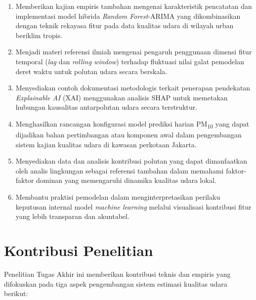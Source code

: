 \begin{enumerate}
   \item Memberikan kajian empiris tambahan mengenai karakteristik pencatatan dan implementasi model hibrida \textit{Random Forest}-ARIMA yang dikombinasikan dengan teknik rekayasa fitur pada data kualitas udara di wilayah urban beriklim tropis.
   \item Menjadi materi referensi ilmiah mengenai pengaruh penggunaan dimensi fitur temporal (\textit{lag} dan \textit{rolling window}) terhadap fluktuasi nilai galat pemodelan deret waktu untuk polutan udara secara berskala.
   \item Menyediakan contoh dokumentasi metodologis terkait penerapan pendekatan \textit{Explainable AI} (XAI) menggunakan analisis SHAP untuk memetakan hubungan kausalitas antarpolutan udara secara terstruktur.
   \item Menghasilkan rancangan konfigurasi model prediksi harian PM\textsubscript{10} yang dapat dijadikan bahan pertimbangan atau komponen awal dalam pengembangan sistem kajian kualitas udara di kawasan perkotaan Jakarta.
   \item Menyediakan data dan analisis kontribusi polutan yang dapat dimanfaatkan oleh analis lingkungan sebagai referensi tambahan dalam memahami faktor-faktor dominan yang memengaruhi dinamika kualitas udara lokal.
   \item Membantu praktisi pemodelan dalam menginterpretasikan perilaku keputusan internal model \textit{machine learning} melalui visualisasi kontribusi fitur yang lebih transparan dan akuntabel.
\end{enumerate}

\section{Kontribusi Penelitian}

Penelitian Tugas Akhir ini memberikan kontribusi teknis dan empiris yang difokuskan pada tiga aspek pengembangan sistem estimasi kualitas udara berikut:


